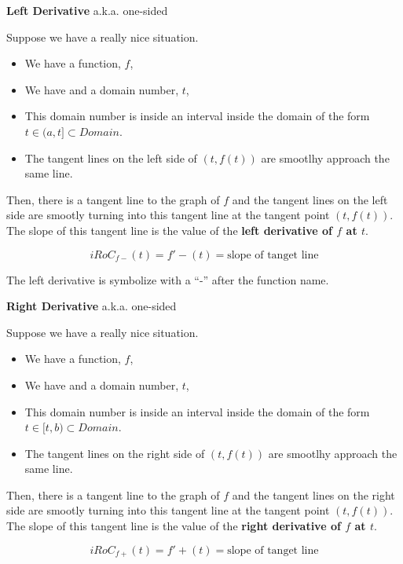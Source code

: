 \documentclass{ximera}
\begin{document}
\begin{definition} \textbf{\textcolor{green!50!black}{Left Derivative}}  a.k.a. one-sided 


Suppose we have a really nice situation.


\begin{itemize}
\item We have a function, $f$, 
\item We have and a domain number, $t$, 
\item This domain number is inside an  interval inside the domain of the form  $t \in (a, t] \subset Domain$. 
\item The tangent lines on the left side of $(t, f(t))$ are smootlhy approach the same line.
\end{itemize}

Then, there is a tangent line to the graph of $f$ and the tangent lines on the left side are smootly turning into this tangent line at the tangent point $(t, f(t))$. \\

The slope of this tangent line is the value of the \textbf{left derivative of $f$ at $t$}.

\[
iRoC_{f-}(t) =f'-(t) = \text{slope of tanget line}
\]


 

\end{definition}
The left derivative is symbolize with a ``-'' after the function name. \\





\begin{definition} \textbf{\textcolor{green!50!black}{Right Derivative}}  a.k.a. one-sided 


Suppose we have a really nice situation.


\begin{itemize}
\item We have a function, $f$, 
\item We have and a domain number, $t$, 
\item This domain number is inside an  interval inside the domain of the form  $t \in [t, b) \subset Domain$. 
\item The tangent lines on the right side of $(t, f(t))$ are smootlhy approach the same line.
\end{itemize}

Then, there is a tangent line to the graph of $f$ and the tangent lines on the right side are smootly turning into this tangent line at the tangent point $(t, f(t))$. \\

The slope of this tangent line is the value of the \textbf{right derivative of $f$ at $t$}.

\[
iRoC_{f+}(t) =f'+(t) = \text{slope of tanget line}
\]


 

\end{definition}
\end{document}
